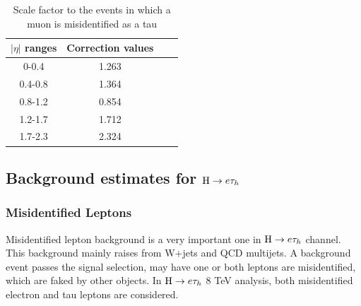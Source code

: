 \begin{table}[htp]
\caption{Scale factor to the events in which a muon is misidentified as a tau}\label{tb:MFTcorrection}
\begin{center}
\begin{tabular}{|c|c|c|c|}
\hline
$|\eta|$ ranges             & Correction values \\\hline
0-0.4                             & 1.263                   \\
0.4-0.8                          & 1.364           \\
0.8-1.2                          & 0.854        \\
1.2-1.7                          & 1.712  \\
1.7-2.3                          & 2.324                                  \\\hline
 \end{tabular}
\end{center}
\end{table}







\subsection{Background estimates for $\mathrm{H} \to e \tau_{h}$}

\subsubsection{Misidentified Leptons}

Misidentified lepton background is a very important one in $\mathrm{H} \to e \tau_{h}$ channel. This background mainly raises from W+jets and QCD multijets. A background event passes the signal selection, may have one or both leptons are misidentified, which are faked by other objects. In $\mathrm{H} \to e \tau_{h}$ 8 TeV analysis, both misidentified electron and tau leptons are considered. 

